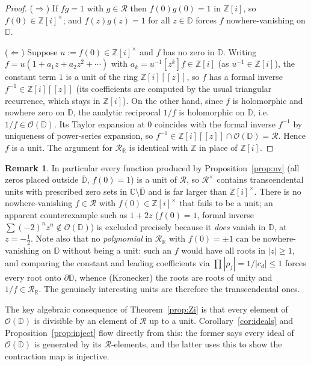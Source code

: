 \documentclass[12pt]{amsart}
\theoremstyle{definition}
\newtheorem{remark}[theorem]{Remark}
\newcommand{\D}{\mathbb{D}}
\newcommand{\Z}{\mathbb{Z}}
\newcommand{\Zi}{\mathbb{Z}[i]}
\newcommand{\C}{\mathbb{C}}
\newcommand{\abs}[1]{\left|#1\right|}
\newcommand{\OD}{\mathcal{O}(\D)}
\newcommand{\mR}{\mathcal{R}}
\newcommand{\mRR}{\mathcal{R}_{\mathbb{R}}}
\begin{document}
\begin{proof}
($\Rightarrow$) If $fg = 1$ with $g \in \mR$ then $f(0)g(0) = 1$ in
$\Zi$, so $f(0) \in \Zi^\times$; and $f(z)g(z) = 1$ for all $z \in \D$
forces $f$ nowhere-vanishing on $\D$.

($\Leftarrow$) Suppose $u := f(0) \in \Zi^\times$ and $f$ has no zero in
$\D$.  Writing $f = u(1 + a_1 z + a_2 z^2 + \cdots)$ with $a_k =
u^{-1}[z^k]f \in \Zi$ (as $u^{-1} \in \Zi$), the constant term $1$ is a
unit of the ring $\Zi[[z]]$, so $f$ has a formal inverse $f^{-1} \in
\Zi[[z]]$ (its coefficients are computed by the usual triangular
recurrence, which stays in $\Zi$).  On the other hand, since $f$ is
holomorphic and nowhere zero on $\D$, the analytic reciprocal $1/f$ is
holomorphic on $\D$, i.e.\ $1/f \in \OD$.  Its Taylor expansion at $0$
coincides with the formal inverse $f^{-1}$ by uniqueness of power-series
expansion, so $f^{-1} \in \Zi[[z]] \cap \OD = \mR$.  Hence $f$ is a unit.
The argument for $\mRR$ is identical with $\Z$ in place of $\Zi$.
\end{proof}

\begin{remark}
\label{rem:nv-units}
In particular every function produced by Proposition~\ref{prop:nv} (all
zeros placed outside $\overline{\D}$, $f(0) = 1$) is a unit of $\mR$, so
$\mR^\times$ contains transcendental units with prescribed zero sets in
$\C \setminus \overline{\D}$ and is far larger than $\Zi^\times$.
There is no nowhere-vanishing $f \in \mR$ with $f(0) \in \Zi^\times$
that fails to be a unit; an apparent counterexample such as $1 + 2z$
($f(0) = 1$, formal inverse $\sum(-2)^n z^n \notin \OD$) is excluded
precisely because it \emph{does} vanish in $\D$, at $z = -\tfrac12$.
Note also that no \emph{polynomial} in $\mRR$ with $f(0) = \pm 1$ can be
nowhere-vanishing on $\D$ without being a unit: such an $f$ would have
all roots in $\abs{z} \geq 1$, and comparing the constant and leading
coefficients via $\prod \abs{\rho_j} = 1/\abs{c_d} \leq 1$ forces every
root onto $\partial\D$, whence (Kronecker) the roots are roots of unity
and $1/f \in \mRR$.  The genuinely interesting units are therefore the
transcendental ones.
\end{remark}

The key algebraic consequence of Theorem~\ref{prop:Zi} is that every
element of $\OD$ is divisible by an element of $\mR$ up to a unit.
Corollary~\ref{cor:ideals} and Proposition~\ref{prop:inject} flow directly
from this: the former says every ideal of $\OD$ is generated by its
$\mR$-elements, and the latter uses this to show the contraction map is
injective.
\end{document}
